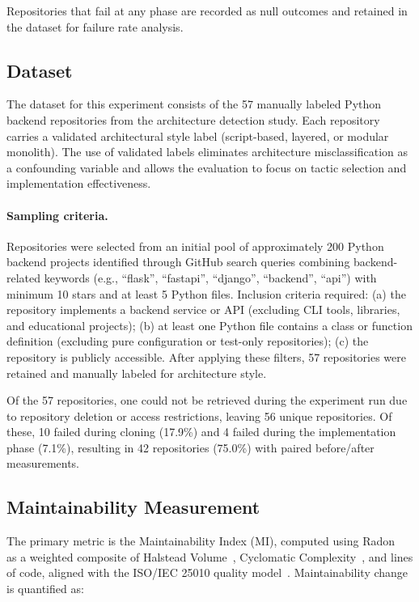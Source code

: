 \documentclass[sigconf,review,anonymous]{acmart}
\begin{document}
Repositories that fail at any phase are recorded as null outcomes and retained in the dataset for failure rate analysis.

\subsection{Dataset}

The dataset for this experiment consists of the 57 manually labeled Python backend repositories from the architecture detection study. Each repository carries a validated architectural style label (script-based, layered, or modular monolith). The use of validated labels eliminates architecture misclassification as a confounding variable and allows the evaluation to focus on tactic selection and implementation effectiveness.

\paragraph{Sampling criteria.}
Repositories were selected from an initial pool of approximately 200 Python backend projects identified through GitHub search queries combining backend-related keywords (e.g., ``flask'', ``fastapi'', ``django'', ``backend'', ``api'') with minimum 10 stars and at least 5 Python files. Inclusion criteria required: (a) the repository implements a backend service or API (excluding CLI tools, libraries, and educational projects); (b) at least one Python file contains a class or function definition (excluding pure configuration or test-only repositories); (c) the repository is publicly accessible. After applying these filters, 57 repositories were retained and manually labeled for architecture style.

Of the 57 repositories, one could not be retrieved during the experiment run due to repository deletion or access restrictions, leaving 56 unique repositories. Of these, 10 failed during cloning (17.9\%) and 4 failed during the implementation phase (7.1\%), resulting in 42 repositories (75.0\%) with paired before/after measurements.

\subsection{Maintainability Measurement}

The primary metric is the Maintainability Index (MI), computed using Radon~\cite{oman1992maintainability} as a weighted composite of Halstead Volume~\cite{halstead1977elements}, Cyclomatic Complexity~\cite{mccabe1976complexity}, and lines of code, aligned with the ISO/IEC 25010 quality model~\cite{ISO25010}. Maintainability change is quantified as:
\end{document}
